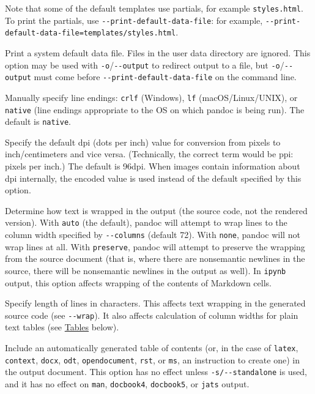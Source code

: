 \documentclass[
]{article}
\begin{document}
\begin{description}
Note that some of the default templates use partials, for example
\texttt{styles.html}. To print the partials, use
\texttt{-\/-print-default-data-file}: for example,
\texttt{-\/-print-default-data-file=templates/styles.html}.
\item[\texttt{-\/-print-default-data-file=}\emph{FILE}]
Print a system default data file. Files in the user data directory are
ignored. This option may be used with \texttt{-o}/\texttt{-\/-output} to
redirect output to a file, but \texttt{-o}/\texttt{-\/-output} must come
before \texttt{-\/-print-default-data-file} on the command line.
\item[\texttt{-\/-eol=crlf}\textbar{}\texttt{lf}\textbar{}\texttt{native}]
Manually specify line endings: \texttt{crlf} (Windows), \texttt{lf}
(macOS/Linux/UNIX), or \texttt{native} (line endings appropriate to the
OS on which pandoc is being run). The default is \texttt{native}.
\item[\texttt{-\/-dpi}=\emph{NUMBER}]
Specify the default dpi (dots per inch) value for conversion from pixels
to inch/centimeters and vice versa. (Technically, the correct term would
be ppi: pixels per inch.) The default is 96dpi. When images contain
information about dpi internally, the encoded value is used instead of
the default specified by this option.
\item[\texttt{-\/-wrap=auto}\textbar{}\texttt{none}\textbar{}\texttt{preserve}]
Determine how text is wrapped in the output (the source code, not the
rendered version). With \texttt{auto} (the default), pandoc will attempt
to wrap lines to the column width specified by \texttt{-\/-columns}
(default 72). With \texttt{none}, pandoc will not wrap lines at all.
With \texttt{preserve}, pandoc will attempt to preserve the wrapping
from the source document (that is, where there are nonsemantic newlines
in the source, there will be nonsemantic newlines in the output as
well). In \texttt{ipynb} output, this option affects wrapping of the
contents of Markdown cells.
\item[\texttt{-\/-columns=}\emph{NUMBER}]
Specify length of lines in characters. This affects text wrapping in the
generated source code (see \texttt{-\/-wrap}). It also affects
calculation of column widths for plain text tables (see
\protect\hyperlink{tables}{Tables} below).
\item[\texttt{-\/-toc{[}=true\textbar{}false{]}},
\texttt{-\/-table-of-contents{[}=true\textbar{}false{]}}]
Include an automatically generated table of contents (or, in the case of
\texttt{latex}, \texttt{context}, \texttt{docx}, \texttt{odt},
\texttt{opendocument}, \texttt{rst}, or \texttt{ms}, an instruction to
create one) in the output document. This option has no effect unless
\texttt{-s/-\/-standalone} is used, and it has no effect on
\texttt{man}, \texttt{docbook4}, \texttt{docbook5}, or \texttt{jats}
output.


\end{description}
\end{document}
